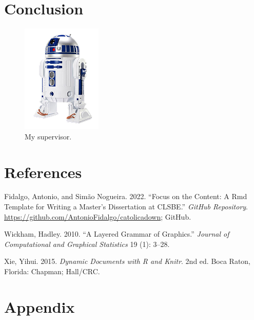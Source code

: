 \documentclass[
  12pt,
]{article}
\newlength{\cslhangindent}
\newlength{\cslentryspacingunit} %
\newenvironment{CSLReferences}[2] %
 {%
  \setlength{\parindent}{0pt}
  \ifodd #1
  \let\oldpar\par
  \def\par{\hangindent=\cslhangindent\oldpar}
  \fi
  \setlength{\parskip}{#2\cslentryspacingunit}
 }%
 {}
\begin{document}
\clearpage

\hypertarget{sec-conclusion}{%
\section{Conclusion}\label{sec-conclusion}}

\begin{figure}

{\centering \includegraphics[width=0.2\linewidth]{figures/r2d2} 

}

\caption{My supervisor.}\label{fig:r2d2pic}
\end{figure}

\clearpage

\hypertarget{references}{%
\section*{References}\label{references}}

\hypertarget{refs}{}
\begin{CSLReferences}{1}{0}
\leavevmode{}%
Fidalgo, Antonio, and Simão Nogueira. 2022. {``Focus on the Content: A Rmd Template for Writing a Master's Dissertation at CLSBE.''} \emph{GitHub Repository}. \url{https://github.com/AntonioFidalgo/catolicadown}; GitHub.

\leavevmode{}%
Wickham, Hadley. 2010. {``A Layered Grammar of Graphics.''} \emph{Journal of Computational and Graphical Statistics} 19 (1): 3--28.

\leavevmode{}%
Xie, Yihui. 2015. \emph{Dynamic Documents with {R} and Knitr}. 2nd ed. Boca Raton, Florida: Chapman; Hall/CRC.

\end{CSLReferences}

\clearpage

\appendix

\hypertarget{appendix}{%
\section{Appendix}\label{appendix}}
\end{document}
